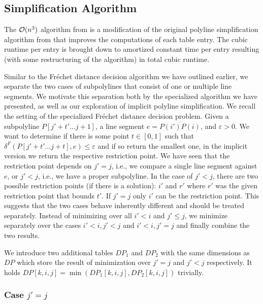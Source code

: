 \subsection{Simplification Algorithm}
\label{ssec:simplification_algo_cubic}

The \(\mathcal{O}(n^3)\) algorithm from \citeauthor{polyline_simplification_has_cubic_complexity_bringmannetal} is a modification of the original polyline simplification algorithm from \citeauthor{on_optimal_polyline_simplification_using_the_hausdorff_and_frechet_distance} that improves the computations of each table entry. The cubic runtime per entry is brought down to amortized constant time per entry resulting (with some restructuring of the algorithm) in total cubic runtime. 

Similar to the Fréchet distance decision algorithm we have outlined earlier, we separate the two cases of subpolylines that consist of one or multiple line segments. We motivate this separation both by the specialized algorithm we have presented, as well as our exploration of implicit polyline simplification. We recall the setting of the specialized Fréchet distance decision problem. Given a subpolyline \(P[j' + t' \dots j + 1]\), a line segment \(e = \overline{P(i')P(i)}\), and \(\varepsilon > 0\). We want to determine if there is some point \(t \in [0, 1]\) such that \(\delta^F(P[j' + t' \dots j + t], e) \leq \varepsilon\) and if so return the smallest one, in the implicit version we return the respective restriction point. We have seen that the restriction point depends on \(j' = j\), i.e., we compare a single line segment against \(e\), or \(j' < j\), i.e., we have a proper subpolyline. 
In the case of \(j' < j\), there are two possible restriction points (if there is a solution): \(i'\) and \(r'\) where \(r'\) was the given restriction point that bounds \(t'\). If \(j' = j\) only \(i'\) can be the restriction point. This suggests that the two cases behave inherently different and should be treated separately. Instead of minimizing over all \(i' < i\) and \(j' \leq j\), we minimize separately over the cases \(i' < i, j' < j\) and \(i' < i, j' = j\) and finally combine the two results.

We introduce two additional tables \(DP_1\) and \(DP_2\) with the same dimensions as \(DP\) which store the result of minimization over \(j'=j\) and \(j' < j\) respectively. It holds \(DP[k, i, j] = \min(DP_1[k,i,j], DP_2[k,i,j])\) trivially. 

\subsubsection{Case \(j' = j\)}

